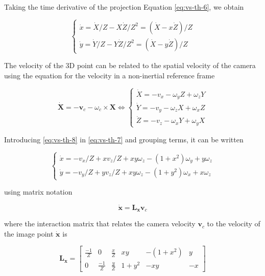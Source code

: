 Taking the time derivative of the projection Equation \ref{eq:vs-th-6}, we obtain

\begin{equation}
\begin{cases}
\dot{x} = \dot{X}/Z - X\dot{Z}/Z^2 = (\dot{X} - x \dot{Z})/Z \\
\dot{y} = \dot{Y}/Z - Y\dot{Z}/Z^2 = (\dot{X} - y \dot{Z})/Z
\end{cases}
\label{eq:vs-th-7}
\end{equation}

The velocity of the 3D point can be related to the spatial velocity of the camera using the equation for the velocity in a non-inertial reference frame

\begin{equation}
\dot{\bm{X}} = - \bm{v}_c - \omega_c \times \bm{X} \Leftrightarrow
\begin{cases}
\dot{X} = - v_x - \omega_y Z + \omega_z Y \\
\dot{Y} = - v_y - \omega_z X + \omega_x Z \\
\dot{Z} = - v_z - \omega_x Y + \omega_y X 
\end{cases}
\label{eq:vs-th-8}
\end{equation}

Introducing \ref{eq:vs-th-8} in \ref{eq:vs-th-7} and grouping terms, it can be written

\begin{equation}
\begin{cases}
\dot{x} = - v_x / Z + x v_z / Z + xy \omega_z - (1 + x^2) \omega_y + y \omega_z \\
\dot{y} = - v_y / Z + y v_z / Z + xy \omega_z - (1 + y^2) \omega_x + x \omega_z 
\end{cases}
\label{eq:vs-th-9}
\end{equation}

using matrix notation

\begin{equation}
\dot{\bm{x}} = \bm{L_x} \bm{v}_c
\label{eq:vs-th-10}
\end{equation}

where the interaction matrix that relates the camera velocity $\bm{v}_c$ to the velocity of the image point $\dot{\bm{x}}$ is

\begin{equation}
\bm{L_x} = 
\begin{bmatrix}
\frac{-1}{Z} & 0  & \frac{x}{Z}  & xy  &  -(1+x^2) & y \\ 
0 & \frac{-1}{Z} &  \frac{y}{Z} & 1+y^2 &  -xy & -x
\end{bmatrix}
\label{eq:vs-th-11}
\end{equation}

